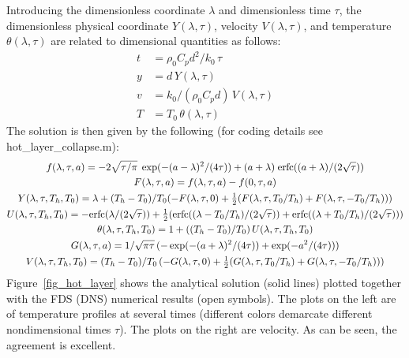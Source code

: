 \documentclass[11pt]{book}
\begin{document}
Introducing the dimensionless coordinate $\lambda$ and dimensionless time $\tau$, the dimensionless physical coordinate $Y(\lambda,\tau)$, velocity $V(\lambda,\tau)$, and temperature $\theta(\lambda,\tau)$ are related to dimensional quantities as follows:
\begin{align}
t &= \rho_0 C_p d^2/k_0 \, \tau  \\
y &= d \, Y(\lambda,\tau) \\
v &= k_0/(\rho_0 C_p d) \, V(\lambda,\tau) \\
T &= T_0 \, \theta(\lambda,\tau)
\end{align}
The solution is then given by the following (for coding details see {\ct hot\_layer\_collapse.m}):
\begin{gather}
f(\lambda,\tau,a) = -2\sqrt{\tau/\pi}\;\exp(-(a-\lambda)^2/(4\tau)) + (a+\lambda)\;\hbox{erfc}((a+\lambda)/(2\sqrt{\tau})) \\
F(\lambda,\tau,a) = f(\lambda,\tau,a) - f(0,\tau,a) \\
Y(\lambda,\tau,T_h,T_0) = \lambda + (T_h-T_0)/T_0( -F(\lambda,\tau,0) + \mbox{$\frac{1}{2}$}( F(\lambda,\tau,T_0/T_h) + F(\lambda,\tau,-T_0/T_h) ) ) \\
U(\lambda,\tau,T_h,T_0) = -\hbox{erfc}(\lambda/(2\sqrt{\tau})) + \mbox{$\frac{1}{2}$}( \hbox{erfc}( (\lambda - T_0/T_h)/(2\sqrt{\tau}) ) + \hbox{erfc}( (\lambda + T_0/T_h)/(2\sqrt{\tau}) ) ) \\
\theta(\lambda,\tau,T_h,T_0) = 1 + ( (T_h - T_0)/T_0 ) \, U(\lambda,\tau,T_h,T_0) \\
G(\lambda,\tau,a) = 1/\sqrt{\pi\tau} \, ( -\exp(-(a+\lambda)^2/(4\tau)) + \exp(-a^2/(4\tau)) ) \\
V(\lambda,\tau,T_h,T_0) = (T_h-T_0)/T_0 \, ( -G(\lambda,\tau,0) + \mbox{$\frac{1}{2}$}(G(\lambda,\tau,T_0/T_h) + G(\lambda,\tau,-T_0/T_h)) )
\end{gather}
Figure~\ref{fig_hot_layer} shows the analytical solution (solid lines) plotted together with the FDS (DNS) numerical results (open symbols).  The plots on the left are of temperature profiles at several times (different colors demarcate different nondimensional times $\tau$).  The plots on the right are velocity.  As can be seen, the agreement is excellent.
\end{document}
